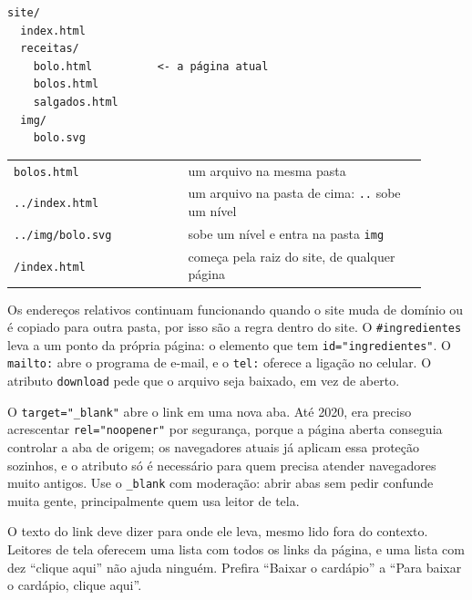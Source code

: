 \begin{codigo}
\begin{Verbatim}[breaklines=true, breaksymbolleft={}, fontsize=\footnotesize]
site/
  index.html
  receitas/
    bolo.html          <- a página atual
    bolos.html
    salgados.html
  img/
    bolo.svg
\end{Verbatim}
\end{codigo}

\begin{center}
\begin{tabular}{@{}P{0.38\linewidth}P{0.52\linewidth}@{}}
\toprule
{}
 &  \\
\midrule
\texttt{bolos.html} & um arquivo na mesma pasta \\
 \texttt{../index.html} & um arquivo na pasta de cima: \texttt{..} sobe um nível \\
\texttt{../img/bolo.svg} & sobe um nível e entra na pasta \texttt{img} \\
 \texttt{/index.html} & começa pela raiz do site, de qualquer página \\
\bottomrule
\end{tabular}
\end{center}

Os endereços relativos continuam funcionando quando o site muda de domínio ou é copiado para outra pasta, por isso são a regra dentro do site. O \texttt{\#ingredientes} leva a um ponto da própria página: o elemento que tem \texttt{id="ingredientes"}. O \texttt{mailto:} abre o programa de e-mail, e o \texttt{tel:} oferece a ligação no celular. O atributo \texttt{download} pede que o arquivo seja baixado, em vez de aberto.

O \texttt{target="\_blank"} abre o link em uma nova aba. Até 2020, era preciso acrescentar \texttt{rel="noopener"} por segurança, porque a página aberta conseguia controlar a aba de origem; os navegadores atuais já aplicam essa proteção sozinhos, e o atributo só é necessário para quem precisa atender navegadores muito antigos. Use o \texttt{\_blank} com moderação: abrir abas sem pedir confunde muita gente, principalmente quem usa leitor de tela.

O texto do link deve dizer para onde ele leva, mesmo lido fora do contexto. Leitores de tela oferecem uma lista com todos os links da página, e uma lista com dez ``clique aqui'' não ajuda ninguém. Prefira ``Baixar o cardápio'' a ``Para baixar o cardápio, clique aqui''.

